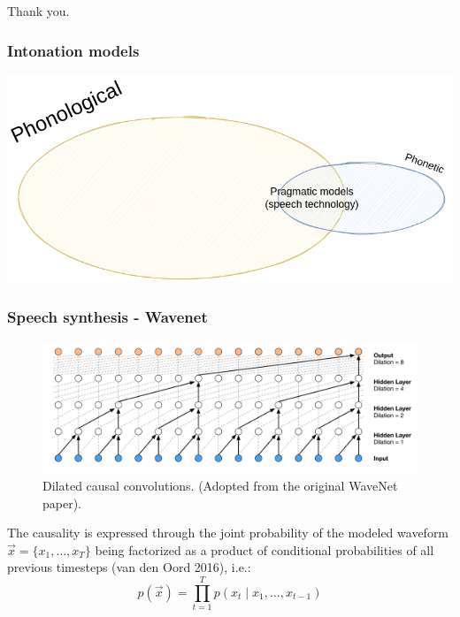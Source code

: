 \documentclass[a4paper,9pt]{beamer}
\theoremstyle{mytheoremstyle}
\begin{document}

\begin{frame}
\begin{center}
Thank you.
\end{center}
\end{frame}
























\begin{frame}
\frametitle{Intonation models}
\includegraphics[width=\textwidth]{res/inotnation_models_venn.png}
\end{frame}

\begin{frame}
\frametitle{Speech synthesis - Wavenet}
\begin{figure}
\begin{center}
  \includegraphics[width=\textwidth]{res/dilated_convolutions.png}
\end{center}
	\caption{Dilated causal convolutions. (Adopted from the original WaveNet paper).}
\end{figure}
The causality is expressed through the joint probability of the modeled waveform 
$\vec{x} = \{ x_1, \dots, x_T \}$
being factorized as a product of conditional probabilities of all previous timesteps (van den Oord 2016), i.e.:
\begin{equation}
p\left(\vec{x}\right) = \prod_{t=1}^{T} p\left(x_t \mid x_1, \dots ,x_{t-1}\right)
\end{equation}
\end{frame}
\end{document}
